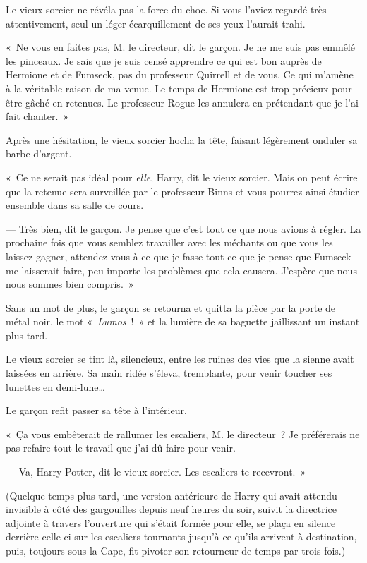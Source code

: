 Le vieux sorcier ne révéla pas la force du choc. Si vous l'aviez regardé très attentivement, seul un léger écarquillement de ses yeux l'aurait trahi.

«~Ne vous en faites pas, M. le directeur, dit le garçon. Je ne me suis pas emmêlé les pinceaux. Je sais que je suis censé apprendre ce qui est bon auprès de Hermione et de Fumseck, pas du professeur Quirrell et de vous. Ce qui m'amène à la véritable raison de ma venue. Le temps de Hermione est trop précieux pour être gâché en retenues. Le professeur Rogue les annulera en prétendant que je l'ai fait chanter.~»

Après une hésitation, le vieux sorcier hocha la tête, faisant légèrement onduler sa barbe d'argent.

«~Ce ne serait pas idéal pour \emph{elle}, Harry, dit le vieux sorcier. Mais on peut écrire que la retenue sera surveillée par le professeur Binns et vous pourrez ainsi étudier ensemble dans sa salle de cours.

--- Très bien, dit le garçon. Je pense que c'est tout ce que nous avions à régler. La prochaine fois que vous semblez travailler avec les méchants ou que vous les laissez gagner, attendez-vous à ce que je fasse tout ce que je pense que Fumseck me laisserait faire, peu importe les problèmes que cela causera. J'espère que nous nous sommes bien compris.~»

Sans un mot de plus, le garçon se retourna et quitta la pièce par la porte de métal noir, le mot «~\emph{Lumos}~!~» et la lumière de sa baguette jaillissant un instant plus tard.

Le vieux sorcier se tint là, silencieux, entre les ruines des vies que la sienne avait laissées en arrière. Sa main ridée s'éleva, tremblante, pour venir toucher ses lunettes en demi-lune…

Le garçon refit passer sa tête à l'intérieur.

«~Ça vous embêterait de rallumer les escaliers, M. le directeur~? Je préférerais ne pas refaire tout le travail que j'ai dû faire pour venir.

--- Va, Harry Potter, dit le vieux sorcier. Les escaliers te recevront.~»

(Quelque temps plus tard, une version antérieure de Harry qui avait attendu invisible à côté des gargouilles depuis neuf heures du soir, suivit la directrice adjointe à travers l'ouverture qui s'était formée pour elle, se plaça en silence derrière celle-ci sur les escaliers tournants jusqu'à ce qu'ils arrivent à destination, puis, toujours sous la Cape, fit pivoter son retourneur de temps par trois fois.)

